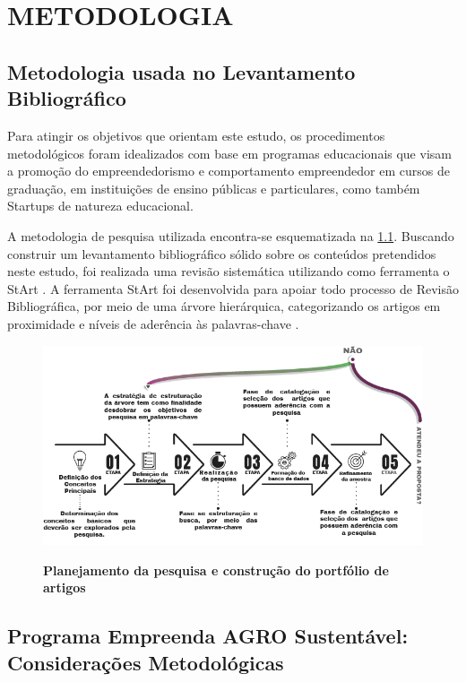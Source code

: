 \chapter{METODOLOGIA}

\section{Metodologia usada no Levantamento Bibliográfico}


Para atingir os objetivos que orientam este estudo, os procedimentos metodológicos foram idealizados com base em programas educacionais que visam a promoção do empreendedorismo e comportamento empreendedor em cursos de graduação, em instituições de ensino públicas e particulares, como também Startups de natureza educacional.


A metodologia de pesquisa utilizada encontra-se esquematizada na \ref{figura_29}. Buscando construir um levantamento bibliográfico sólido sobre os conteúdos pretendidos neste estudo, foi realizada uma revisão sistemática utilizando como ferramenta o StArt \cite{lapes_start_2016}. A ferramenta StArt foi desenvolvida para apoiar todo processo de Revisão Bibliográfica, por meio de uma árvore hierárquica, categorizando os artigos em proximidade e níveis de aderência às palavras-chave \cite{hernandes_avaliacao_2010}.


\begin{figure}[H]
\centering
\caption{\textbf{Planejamento da pesquisa e construção do portfólio de artigos}}
\includegraphics[scale=0.28]{Imagens/fases_pesquisa_bibliografica.png}
\label{figura_29}
\end{figure}

\section{Programa Empreenda AGRO Sustentável: Considerações Metodológicas}


